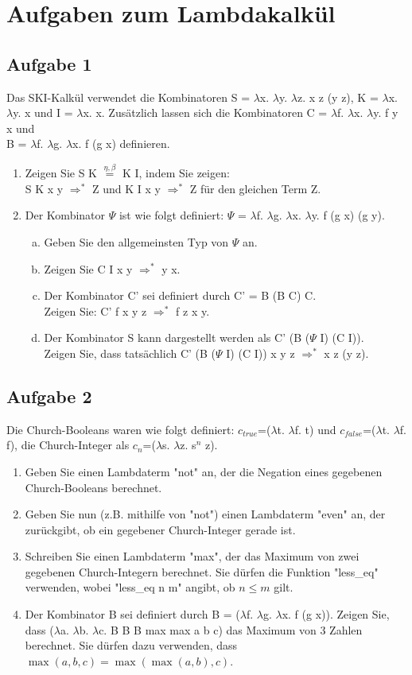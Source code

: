 \documentclass{scrartcl}
\newcommand{\same}{$\stackrel{\eta,\beta}{=}$}
\renewcommand{\l}{$\lambda$}
\begin{document}
\section*{Aufgaben zum Lambdakalkül}
\subsection*{Aufgabe 1}
Das SKI-Kalkül verwendet die Kombinatoren S = \l x. \l y. \l z. x z (y z), K = \l x. \l y. x und I = \l x. x. Zusätzlich lassen sich die Kombinatoren C = \l f. \l x. \l y. f y x und\\ B = \l f. \l g. \l x. f (g x) definieren.
\begin{enumerate}[1.]
\item Zeigen Sie S K \same{} K I, indem Sie zeigen:\\
S K x y $\Rightarrow^*$ Z und K I x y $\Rightarrow^*$ Z für den gleichen Term Z.
\item Der Kombinator $\Psi$ ist wie folgt definiert: $\Psi$ = \l f. \l g. \l x. \l y. f (g x) (g y).
\begin{enumerate}[(a)]
\item Geben Sie den allgemeinsten Typ von $\Psi$ an.
\item Zeigen Sie C I x y $\Rightarrow^*$ y x.
\item Der Kombinator C' sei definiert durch C' = B (B C) C.\\
Zeigen Sie: C' f x y z $\Rightarrow^*$ f z x y.
\item Der Kombinator S kann dargestellt werden als C' (B ($\Psi$ I) (C I)).\\ Zeigen Sie, dass tatsächlich C' (B ($\Psi$ I) (C I)) x y z $\Rightarrow^*$ x z (y z).
\end{enumerate} 
\end{enumerate}

\subsection*{Aufgabe 2}
Die Church-Booleans waren wie folgt definiert: $c_{true}$=(\l t. \l f. t) und $c_{false}$=(\l t. \l f. f), die Church-Integer als $c_n$=(\l s. \l z. s$^n$ z).
\begin{enumerate}
\item Geben Sie einen Lambdaterm "not" an, der die Negation eines gegebenen Church-Booleans berechnet.
\item Geben Sie nun (z.B. mithilfe von "not") einen Lambdaterm "even" an, der zurückgibt, ob ein gegebener Church-Integer gerade ist.
\item Schreiben Sie einen Lambdaterm "max", der das Maximum von zwei gegebenen Church-Integern berechnet. Sie dürfen die Funktion "less\_eq" verwenden, wobei "less\_eq n m" angibt, ob $n\leq m$ gilt.
\item Der Kombinator B sei definiert durch B = (\l f. \l g. \l x. f (g x)). Zeigen Sie, dass (\l a. \l b. \l c. B B B max max a b c) das Maximum von 3 Zahlen berechnet. Sie dürfen dazu verwenden, dass $\max(a,b,c)=\max(\max(a,b),c)$.
\end{enumerate}
\end{document}
